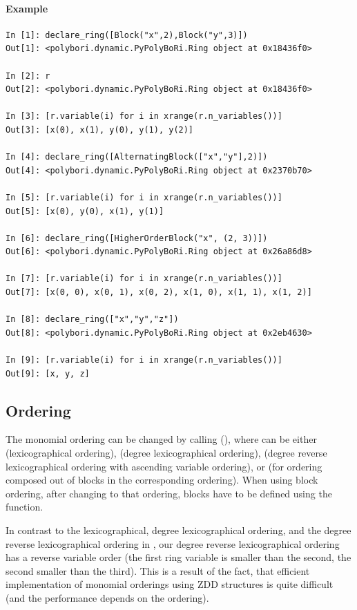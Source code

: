 \paragraph{Example}
\begin{lstlisting}
In [1]: declare_ring([Block("x",2),Block("y",3)])
Out[1]: <polybori.dynamic.PyPolyBoRi.Ring object at 0x18436f0>

In [2]: r
Out[2]: <polybori.dynamic.PyPolyBoRi.Ring object at 0x18436f0>

In [3]: [r.variable(i) for i in xrange(r.n_variables())]
Out[3]: [x(0), x(1), y(0), y(1), y(2)]

In [4]: declare_ring([AlternatingBlock(["x","y"],2)])
Out[4]: <polybori.dynamic.PyPolyBoRi.Ring object at 0x2370b70>

In [5]: [r.variable(i) for i in xrange(r.n_variables())]
Out[5]: [x(0), y(0), x(1), y(1)]

In [6]: declare_ring([HigherOrderBlock("x", (2, 3))])
Out[6]: <polybori.dynamic.PyPolyBoRi.Ring object at 0x26a86d8>

In [7]: [r.variable(i) for i in xrange(r.n_variables())]
Out[7]: [x(0, 0), x(0, 1), x(0, 2), x(1, 0), x(1, 1), x(1, 2)]

In [8]: declare_ring(["x","y","z"])
Out[8]: <polybori.dynamic.PyPolyBoRi.Ring object at 0x2eb4630>

In [9]: [r.variable(i) for i in xrange(r.n_variables())]
Out[9]: [x, y, z]  
\end{lstlisting}



\subsection{Ordering}
The monomial ordering can be changed by calling
(), where  can be either  (lexicographical ordering),  (degree lexicographical ordering),  (degree reverse lexicographical ordering with ascending variable ordering),  or  (for ordering composed out of blocks in the corresponding ordering). When using block ordering, after changing to that ordering, blocks have to be defined using the  function.

In contrast to the lexicographical, degree lexicographical ordering, and the degree reverse lexicographical ordering in \Singular, our degree reverse lexicographical ordering has a reverse variable order (the first ring variable is smaller than the second, the second smaller than the third). This is a result of the fact, that efficient implementation of monomial orderings using ZDD structures is quite difficult (and the performance depends on the ordering).
